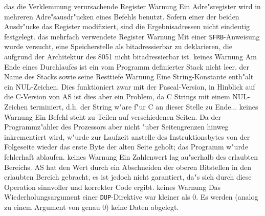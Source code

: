\documentclass[12pt,a4paper,twoside]{report}
\newcommand{\tty}[1]{{\tt #1}}
\begin{document}
{\begin{description}
               {das die Verklemmung verursachende Register}
               {Warnung}
               {Ein Adre"sregister wird in mehreren
                Adre"sausdr"ucken eines Befehls benutzt.  Sofern einer der
                beiden Ausdr"ucke das Register modifiziert, sind die
                Ergebnisadressen nicht eindeutig festgelegt.}
               {das mehrfach verwendete Register}
               {Warnung}
               {Mit einer \tty{SFRB}-Anweisung wurde
                versucht, eine Speicherstelle als bitadressierbar zu
                deklarieren, die aufgrund der Architektur des 8051 nicht
                bitadressierbar ist.}
               {keines}
               {Warnung}
               {Am Ende eines Durchlaufes ist ein vom
                Programm definierter Stack nicht leer.}
               {der Name des Stacks sowie seine Resttiefe}
	       {Warnung}
	       {Eine String-Konstante enth"alt ein 
                NUL-Zeichen. Dies funktioniert zwar mit der Pascal-Version,
                in Hinblick auf die C-Version von AS ist dies aber ein Problem,
                da C Strings mit einem NUL-Zeichen terminiert, d.h. der String
                w"are f"ur C an dieser Stelle zu Ende...}
	       {keines}
	       {Warnung}
	       {Ein Befehl steht zu Teilen auf
                verschiedenen Seiten.  Da der Programmz"ahler des Prozessors
                aber nicht "uber Seitengrenzen hinweg inkrementiert wird,
                w"urde zur Laufzeit anstelle des Instruktionsbytes von der
                Folgeseite wieder das erste Byte der alten Seite geholt; das
                Programm w"urde fehlerhaft ablaufen.}
	       {keines}
               {Warnung}
               {Ein Zahlenwert lag au"serhalb des erlaubten Bereichs.  AS
                hat den Wert durch ein Abschneiden der oberen Bitstellen
                in den erlaubten Bereich gebracht, es ist jedoch nicht
                garantiert, da"s sich durch diese Operation sinnvoller und
                korrekter Code ergibt.}
               {keines}
               {Warnung}
               {Das Wiederholungsargument einer \tty{DUP}-Direktive war
                kleiner als 0.  Es werden (analog zu einem Argument von
                genau 0) keine Daten abgelegt.}

\end{description}}
\end{document}
